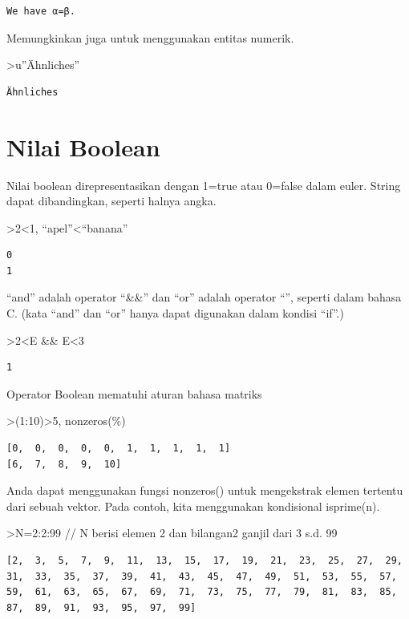 \documentclass[
]{book}
\begin{document}
\begin{verbatim}
We have α=β.
\end{verbatim}

Memungkinkan juga untuk menggunakan entitas numerik.

\textgreater u''Ähnliches''

\begin{verbatim}
Ähnliches
\end{verbatim}

\section{Nilai Boolean}\label{nilai-boolean}

Nilai boolean direpresentasikan dengan 1=true atau 0=false dalam euler. String dapat dibandingkan, seperti halnya angka.

\textgreater2\textless1, ``apel''\textless{}``banana''

\begin{verbatim}
0
1
\end{verbatim}

``and'' adalah operator ``\&\&'' dan ``or'' adalah operator ``\textbar\textbar{}'', seperti dalam bahasa C. (kata ``and'' dan ``or'' hanya dapat digunakan dalam kondisi ``if''.)

\textgreater2\textless E \&\& E\textless3

\begin{verbatim}
1
\end{verbatim}

Operator Boolean mematuhi aturan bahasa matriks

\textgreater(1:10)\textgreater5, nonzeros(\%)

\begin{verbatim}
[0,  0,  0,  0,  0,  1,  1,  1,  1,  1]
[6,  7,  8,  9,  10]
\end{verbatim}

Anda dapat menggunakan fungsi nonzeros() untuk mengekstrak elemen tertentu dari sebuah vektor. Pada contoh, kita menggunakan kondisional isprime(n).

\textgreater N=2:2:99 // N berisi elemen 2 dan bilangan2 ganjil dari 3 s.d. 99

\begin{verbatim}
[2,  3,  5,  7,  9,  11,  13,  15,  17,  19,  21,  23,  25,  27,  29,
31,  33,  35,  37,  39,  41,  43,  45,  47,  49,  51,  53,  55,  57,
59,  61,  63,  65,  67,  69,  71,  73,  75,  77,  79,  81,  83,  85,
87,  89,  91,  93,  95,  97,  99]
\end{verbatim}
\end{document}

